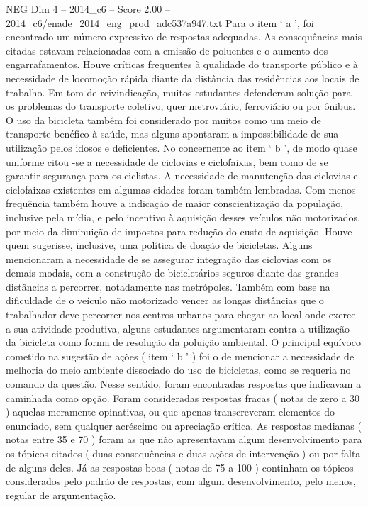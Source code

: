 \begin{textsample}{NEG Dim 4 – 2014\_c6 – Score 2.00 – 2014\_c6/enade\_2014\_eng\_prod\_adc537a947.txt}
Para o item ‘ a ’, foi encontrado um número expressivo de respostas adequadas.
As consequências mais citadas estavam relacionadas com a emissão de poluentes e o aumento dos engarrafamentos.
Houve críticas frequentes à qualidade do transporte público e à necessidade de locomoção rápida diante da distância das residências aos locais de trabalho.
Em tom de reivindicação, muitos estudantes defenderam solução para os problemas do transporte coletivo, quer metroviário, ferroviário ou por ônibus.
O uso da bicicleta também foi considerado por muitos como um meio de transporte benéfico à saúde, mas alguns apontaram a impossibilidade de sua utilização pelos idosos e deficientes.
No concernente ao item ‘ b ’, de modo quase uniforme citou -se a necessidade de ciclovias e ciclofaixas, bem como de se garantir segurança para os ciclistas.
A necessidade de manutenção das ciclovias e ciclofaixas existentes em algumas cidades foram também lembradas.
Com menos frequência também houve a indicação de maior conscientização da população, inclusive pela mídia, e pelo incentivo à aquisição desses veículos não motorizados, por meio da diminuição de impostos para redução do custo de aquisição.
Houve quem sugerisse, inclusive, uma política de doação de bicicletas.
Alguns mencionaram a necessidade de se assegurar integração das ciclovias com os demais modais, com a construção de bicicletários seguros diante das grandes distâncias a percorrer, notadamente nas metrópoles.
Também com base na dificuldade de o veículo não motorizado vencer as longas distâncias que o trabalhador deve percorrer nos centros urbanos para chegar ao local onde exerce a sua atividade produtiva, alguns estudantes argumentaram contra a utilização da bicicleta como forma de resolução da poluição ambiental.
O principal equívoco cometido na sugestão de ações ( item ‘ b ’ ) foi o de mencionar a necessidade de melhoria do meio ambiente dissociado do uso de bicicletas, como se requeria no comando da questão.
Nesse sentido, foram encontradas respostas que indicavam a caminhada como opção.
Foram consideradas respostas fracas ( notas de zero a 30 ) aquelas meramente opinativas, ou que apenas transcreveram elementos do enunciado, sem qualquer acréscimo ou apreciação crítica.
As respostas medianas ( notas entre 35 e 70 ) foram as que não apresentavam algum desenvolvimento para os tópicos citados ( duas consequências e duas ações de intervenção ) ou por falta de alguns deles.
Já as respostas boas ( notas de 75 a 100 ) continham os tópicos considerados pelo padrão de respostas, com algum desenvolvimento, pelo menos, regular de argumentação.

\end{textsample}
